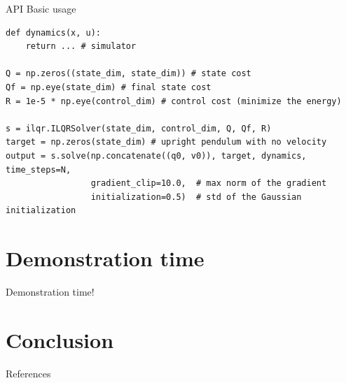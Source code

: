\documentclass[aspectratio=169,draft]{beamer}
\begin{document}
\begin{frame}[fragile]{API Basic usage}
\begin{verbatim}
def dynamics(x, u):
    return ... # simulator

Q = np.zeros((state_dim, state_dim)) # state cost
Qf = np.eye(state_dim) # final state cost
R = 1e-5 * np.eye(control_dim) # control cost (minimize the energy)

s = ilqr.ILQRSolver(state_dim, control_dim, Q, Qf, R)
target = np.zeros(state_dim) # upright pendulum with no velocity
output = s.solve(np.concatenate((q0, v0)), target, dynamics, time_steps=N, 
                 gradient_clip=10.0,  # max norm of the gradient
                 initialization=0.5)  # std of the Gaussian initialization
\end{verbatim}
\end{frame}

\section{Demonstration time}
\begin{frame}
    \begin{center}
        \huge Demonstration time!
    \end{center}
\end{frame}

\section{Conclusion}
\begin{frame}{References}
    \nocite{*}
    \printbibliography
\end{frame}
\end{document}
